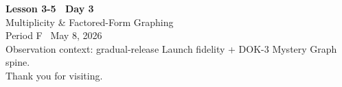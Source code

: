 \documentclass[aspectratio=169, 11pt]{beamer}
\begin{document}
\begin{frame}[plain]
{
\color{white}
\vspace{2cm}
\begin{center}
{\fontsize{26pt}{30pt}\selectfont\bfseries Lesson 3-5 \textperiodcentered\ Day 3}\\[0.6cm]
{\Large Multiplicity \& Factored-Form Graphing}\\[0.8cm]
{\normalsize\color{slidelight} Period F \textperiodcentered\ May 8, 2026}\\[0.4cm]
{\normalsize\color{slidelight!70}
  Observation context: gradual-release Launch fidelity + DOK-3 Mystery Graph spine.\\
  Thank you for visiting.}
\end{center}
}
\end{frame}
\end{document}
